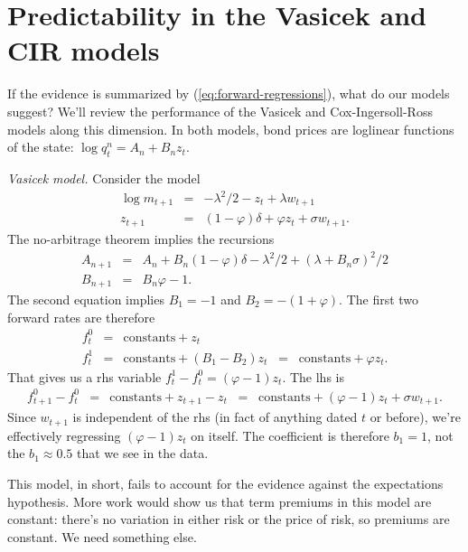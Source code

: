 \documentclass[11pt]{article}
\begin{document}

\section{Predictability in the Vasicek and CIR models}

If the evidence is summarized by (\ref{eq:forward-regressions}),
what do our models suggest?
We'll review the performance of the Vasicek and Cox-Ingersoll-Ross models
along this dimension.
In both models, bond prices are loglinear functions of the state:
$ \log q^n_t = A_n + B_n z_t$.

{\it Vasicek model.\/}
Consider the model
\begin{eqnarray*}
    \log m_{t+1} &=& - \lambda^2/2 - z_t + \lambda w_{t+1} \\
         z_{t+1} &=& (1-\varphi) \delta + \varphi z_t + \sigma w_{t+1} .
\end{eqnarray*}
The no-arbitrage theorem implies the recursions
\begin{eqnarray*}
    A_{n+1} &=& A_n + B_n (1-\varphi) \delta - \lambda^2/2 + (\lambda + B_n \sigma)^2/2 \\
    B_{n+1} &=& B_n \varphi - 1 .
\end{eqnarray*}
The second equation implies
$B_1 = -1$ and $B_2 = -(1+\varphi)$.
The first two forward rates are therefore
\begin{eqnarray*}
    f^0_t &=& \mbox{constants} + z_t \\
    f^1_t &=& \mbox{constants} + (B_1-B_2) z_t
            \;\;=\;\; \mbox{constants} + \varphi z_t .
\end{eqnarray*}
That gives us a rhs variable $f^1_t - f^0_t = (\varphi-1)z_t$.
The lhs is
\begin{eqnarray*}
    f^0_{t+1} - f^0_t &=& \mbox{constants} + z_{t+1} - z_t
                    \;\;=\;\; \mbox{constants} + (\varphi-1) z_t + \sigma w_{t+1}.
\end{eqnarray*}
Since $w_{t+1}$ is independent of the rhs (in fact of anything dated $t$ or before),
we're effectively regressing $(\varphi-1) z_t$
on itself.
The coefficient is therefore $b_1 = 1$, not the $b_1 \approx 0.5$ that we see in the data.

This model, in short, fails to account for the evidence against the expectations
hypothesis.
More work would show us that term premiums in this model are constant:
there's no variation in either risk or the price of risk,
so premiums are constant.
We need something else.
\end{document}
